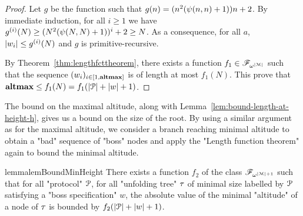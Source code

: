 \begin{proof}
	Let $g$ be the function such that $g(n) = (n^2(\psi(n,n)+1)) n +2$. By immediate induction, for all $i\geq 1$ we have $g^{(i)}(N) \geq (N^2(\psi(N,N)+1))^{i} +2 \geq N$. As a consequence, for all $a$, $|w_i| \leq g^{(i)}(N)$ and $g$ is primitive-recursive.
	
	By Theorem~\ref{thm:lengthfcttheorem}, there exists a function $f_1 \in \mathscr{F}_{\omega^{|\mathcal{M}|}}$ such that the sequence $(w_i)_{i \in [1,\mathbf{altmax}]}$ is of length at most $f_1(N)$. This prove that $\mathbf{altmax} \leq f_1(N) = f_1(|\mathcal{P}| + |w| + 1)$.
\end{proof}


The bound on the maximal altitude, along with Lemma~\ref{lem:bound-length-at-height-h}, gives us a bound on the size of the root. 
By using a similar argument as for the maximal altitude, we consider a branch reaching minimal altitude to obtain a "bad" sequence of "boss" nodes and apply the "Length function theorem" again to bound the minimal altitude.



\begin{restatable}{lemma}{lemBoundMinHeight}
	\label{lem:bound-min-height}
	There exists a function $f_2$ of the class $\mathscr{F}_{\omega^{|\mathcal{M}|+1}}$ such that for all "protocol" $\mathcal{P}$, for all "unfolding tree" $\tau$ of minimal size labelled by $\mathcal{P}$ satisfying a "boss specification" $w$, the absolute value of the minimal "altitude" of a node of $\tau$ is bounded by $f_2(|\mathcal{P}| + |w|+1)$.
\end{restatable}

